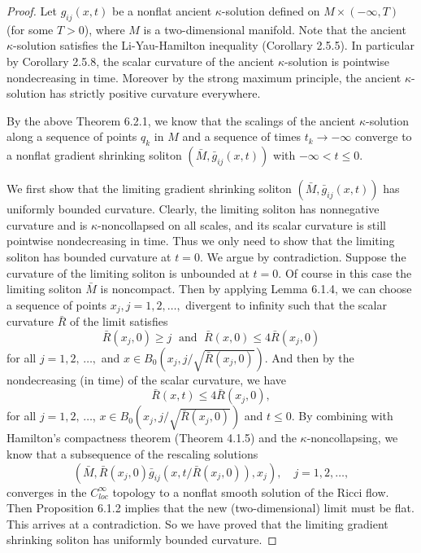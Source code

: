 \begin{proof}
Let $g_{ij}(x,t)$ be a nonflat ancient $\kappa$-solution defined
on $M\times (-\infty,T)$ (for some $T>0$), where $M$ is a
two-dimensional manifold. Note that the ancient $\kappa$-solution
satisfies the Li-Yau-Hamilton inequality (Corollary 2.5.5). In
particular by Corollary 2.5.8, the scalar curvature of the ancient
$\kappa$-solution is pointwise nondecreasing in time. Moreover by
the strong maximum principle, the ancient $\kappa$-solution has
strictly positive curvature everywhere.

By the above Theorem 6.2.1, we know that the scalings of the
ancient $\kappa$-solution along a sequence of points $q_k$ in $M$
and a sequence of times $t_k \rightarrow -\infty$ converge to a
nonflat gradient shrinking soliton $(\bar{M},\bar{g}_{ij}(x,t))$
with $-\infty < t \leq 0$.

We first show that the limiting gradient shrinking soliton
$(\bar{M},\bar{g}_{ij}(x,t))$ has uniformly bounded curvature.
Clearly, the limiting soliton has nonnegative curvature and is
$\kappa$-noncollapsed on all scales, and its scalar curvature is
still pointwise nondecreasing in time. Thus we only need to show
that the limiting soliton has bounded curvature at $t=0$. We argue
by contradiction. Suppose the curvature of the limiting soliton is
unbounded at $t=0$. Of course in this case the limiting soliton
$\bar{M}$ is noncompact. Then by applying Lemma 6.1.4, we can
choose a sequence of points $x_j, j = 1, 2, \ldots,$ divergent to
infinity such that the scalar curvature $\bar{R}$ of the limit
satisfies
$$
\bar{R}(x_j,0) \geq j\; \mbox{ and }\; \bar{R}(x,0) \leq
4\bar{R}(x_j,0)
$$
for all $j = 1, 2,\, \ldots,$ and $x\in
B_0(x_j,{j}/{\sqrt{\bar{R}(x_{j},0)}})$. And then by the
nondecreasing (in time) of the scalar curvature, we have
$$
\bar{R}(x,t) \leq 4\bar{R}(x_j,0),
$$
for all $j = 1, 2,\, \ldots$, $x\in
B_0(x_j,{j}/{\sqrt{\bar{R}(x_{j},0)}})$ and $t\leq0$. By combining
with Hamilton's compactness theorem (Theorem 4.1.5) and the
$\kappa$-noncollapsing, we know that a subsequence of the
rescaling solutions
$$
(\bar{M},\bar{R}(x_j,0)\bar{g}_{ij}(x,t/\bar{R}(x_j,0)),x_j),
\quad j=1, 2, \ldots,
$$
converges in the $C^{\infty}_{loc}$ topology to a nonflat smooth
solution of the Ricci flow. Then Proposition 6.1.2 implies that
the new (two-dimensional) limit must be flat. This arrives at a
contradiction. So we have proved that the limiting gradient
shrinking soliton has uniformly bounded curvature.


\end{proof}
